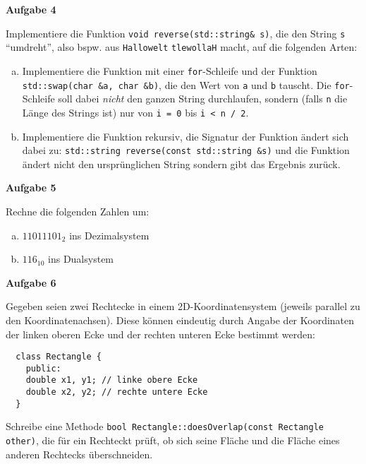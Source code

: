 \documentclass[a4paper,12pt,parskip=full]{scrartcl}
\newcommand{\Aufgabe}[1]{
  {
    \vspace*{0.5cm}
    \textsf{\textbf{Aufgabe #1}}
    \vspace*{0.2cm}
    
  }
}
\begin{document}
\Aufgabe{4} Implementiere die Funktion \lstinline{void reverse(std::string& s)}, die den String \lstinline{s} ``umdreht'',
also bspw. aus \texttt{Hallowelt} \texttt{tlewollaH} macht, auf die
folgenden Arten:
\begin{enumerate}[a)]
\item Implementiere die Funktion mit einer \texttt{for}-Schleife und
  der Funktion \lstinline{std::swap(char &a, char &b)}, die den Wert
  von \texttt{a} und \texttt{b} tauscht. Die \texttt{for}-Schleife
  soll dabei \emph{nicht} den ganzen String durchlaufen, sondern
  (falls \texttt{n} die Länge des Strings ist) nur von \lstinline{i = 0} bis \lstinline{i < n / 2}.
\item Implementiere die Funktion rekursiv, die Signatur der Funktion
  ändert sich dabei zu: \lstinline{std::string reverse(const std::string &s)} und die Funktion ändert nicht den ursprünglichen
  String sondern gibt das Ergebnis zurück.
\end{enumerate}

\Aufgabe{5} Rechne die folgenden Zahlen um:
\begin{enumerate}[a)]
\item $11011101_2$ ins Dezimalsystem
\item $116_{10}$ ins Dualsystem
\end{enumerate}

\Aufgabe{6} Gegeben seien zwei Rechtecke in einem 2D-Koordinatensystem
(jeweils parallel zu den Koordinatenachsen). Diese können eindeutig
durch Angabe der Koordinaten der linken oberen Ecke und der rechten
unteren Ecke bestimmt werden:
\begin{lstlisting}
  class Rectangle {
    public:
    double x1, y1; // linke obere Ecke
    double x2, y2; // rechte untere Ecke
  }
\end{lstlisting}
Schreibe eine Methode \lstinline{bool Rectangle::doesOverlap(const Rectangle other)}, die für ein Rechteckt prüft, ob sich seine Fläche
und die Fläche eines anderen Rechtecks überschneiden.
\end{document}
